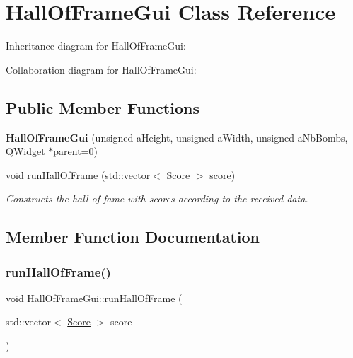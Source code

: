 \hypertarget{class_hall_of_frame_gui}{}\section{Hall\+Of\+Frame\+Gui Class Reference}
\label{class_hall_of_frame_gui}


Inheritance diagram for Hall\+Of\+Frame\+Gui\+:


Collaboration diagram for Hall\+Of\+Frame\+Gui\+:
\subsection*{Public Member Functions}
\begin{DoxyCompactItemize}
\item 
\mbox{\label{class_hall_of_frame_gui_a738c9fc7072323e6ce2703a5819abb09}} 
{\bfseries Hall\+Of\+Frame\+Gui} (unsigned a\+Height, unsigned a\+Width, unsigned a\+Nb\+Bombs, Q\+Widget $\ast$parent=0)
\item 
void \hyperlink{class_hall_of_frame_gui_ad24daeb96ad86b805891a759631c635f}{run\+Hall\+Of\+Frame} (std\+::vector$<$ \hyperlink{class_score}{Score} $>$ score)
\begin{DoxyCompactList}\small\item\em Constructs the hall of fame with scores according to the received data. \end{DoxyCompactList}\end{DoxyCompactItemize}


\subsection{Member Function Documentation}
\mbox{\label{class_hall_of_frame_gui_ad24daeb96ad86b805891a759631c635f}} 
\subsubsection{\texorpdfstring{run\+Hall\+Of\+Frame()}{runHallOfFrame()}}
{\footnotesize\ttfamily void Hall\+Of\+Frame\+Gui\+::run\+Hall\+Of\+Frame (\begin{DoxyParamCaption}\item[{std\+::vector$<$ \hyperlink{class_score}{Score} $>$}]{score }\end{DoxyParamCaption})}



